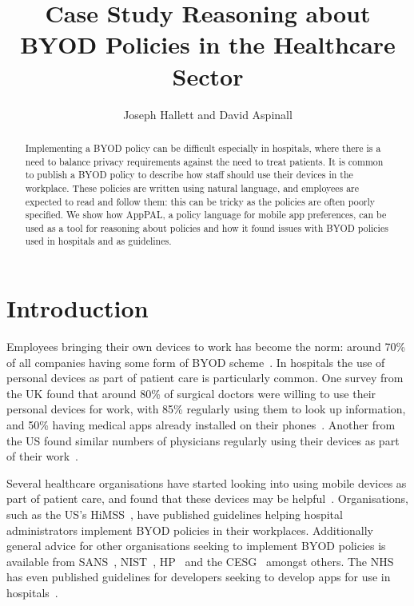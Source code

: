 \documentclass[a4paper]{article}
\title{Case Study Reasoning about BYOD Policies in the Healthcare Sector}
\author{Joseph Hallett and David Aspinall}
\newcommand{\apppal}[0]{App{P}{A}{L}}
\begin{document}
\maketitle

\begin{abstract}
  Implementing a \ac{BYOD} policy can be difficult especially in hospitals, where there is a need to balance privacy requirements against the need to treat patients.
  It is common to publish a \ac{BYOD} policy to describe how staff should use their devices in the workplace.
  These policies are written using natural language, and employees are expected to read and follow them: this can be tricky as the policies are often poorly specified.
  We show how \apppal{}, a policy language for mobile app preferences, can be used as a tool for reasoning about policies and how it found issues with BYOD policies used in hospitals and as guidelines.
\end{abstract}

\section{Introduction}
\label{sec:intro}

Employees bringing their own devices to work has become the norm:
  around 70\% of all companies having some form of \ac{BYOD} scheme~\cite{schulze_byod_2016}.
In hospitals the use of personal devices as part of patient care is particularly common.
One survey from the UK found that around 80\% of surgical doctors were willing to use their personal devices for work, with 85\% regularly using them to look up information, and 50\% having medical apps already installed on their phones~\cite{patel_uk_2015}.  Another from the US found similar numbers of physicians regularly using their devices as part of their work~\cite{moyer_managing_2013}.

Several healthcare organisations have started looking into using mobile devices as part of patient care, and found that these devices may be helpful~\cite{prgomet_impact_2009,faulds_feasibility_2016}.  
Organisations, such as the US's \ac{HiMSS}~\cite{seymour_mobile_2012}, have published guidelines helping hospital administrators implement BYOD policies in their workplaces.  
Additionally general advice for other organisations seeking to implement BYOD policies is available from SANS~\cite{nicholas_r._c._guerin_security_2008}, NIST~\cite{souppaya_guidelines_????}, HP~\cite{hp_byod_????} and the CESG~\cite{cesg_byod_2015} amongst others.
The NHS has even published guidelines for developers seeking to develop apps for use in hospitals~\cite{prgomet_impact_2009}.
\end{document}

